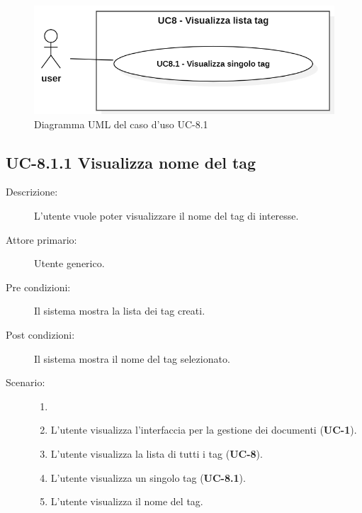 \begin{figure}[H]
    \centering
    \includegraphics[width=0.8\linewidth]{UC8.1.PNG}
    \caption{Diagramma UML del caso d'uso UC-8.1}
    \label{fig:UC8.10}
\end{figure}
\subsection{UC-8.1.1 Visualizza nome del tag}
\begin{description}
    \item[Descrizione:] L’utente vuole poter visualizzare il nome del tag di interesse.
    \item[Attore primario:] Utente generico.
    \item[Pre condizioni:] Il sistema mostra la lista dei tag creati.
    \item[Post condizioni:] Il sistema mostra il nome del tag selezionato.
    \item[Scenario:]
    \begin{enumerate}
        \item[] 
        \item L’utente visualizza l'interfaccia per la gestione dei documenti (\textbf{UC-1}).
        \item L’utente visualizza la lista di tutti i tag (\textbf{UC-8}).
        \item L'utente visualizza un singolo tag (\textbf{UC-8.1}).
        \item L'utente visualizza il nome del tag.
    \end{enumerate}
\end{description}

